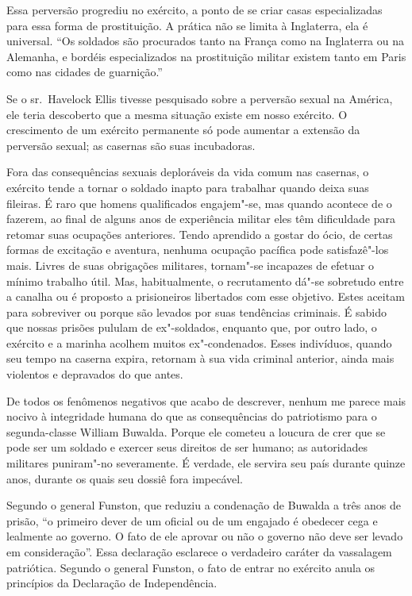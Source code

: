 Essa perversão progrediu no exército, a ponto de se criar casas
especializadas para essa forma de prostituição. A prática não se limita
à Inglaterra, ela é universal. “Os soldados são procurados tanto na
França como na Inglaterra ou na Alemanha, e bordéis especializados na
prostituição militar existem tanto em Paris como nas cidades de
guarnição.”

Se o sr.~Havelock Ellis tivesse pesquisado sobre a perversão sexual na
América, ele teria descoberto que a mesma situação existe em nosso
exército. O crescimento de um exército permanente só pode aumentar a
extensão da perversão sexual; as casernas são suas incubadoras.

Fora das consequências sexuais deploráveis da vida comum nas casernas, o
exército tende a tornar o soldado inapto para trabalhar quando
deixa suas fileiras. É raro que homens qualificados engajem"-se, mas
quando acontece de o fazerem, ao final de alguns anos de experiência
militar eles têm dificuldade para retomar suas ocupações anteriores.
Tendo aprendido a gostar do ócio, de certas formas de excitação e
aventura, nenhuma ocupação pacífica pode satisfazê"-los mais. Livres
de suas obrigações militares, tornam"-se incapazes de efetuar o mínimo
trabalho útil. Mas, habitualmente, o recrutamento dá"-se sobretudo
entre a canalha ou é proposto a prisioneiros libertados com esse
objetivo. Estes aceitam para sobreviver ou porque são levados por suas
tendências criminais. É sabido que nossas prisões pululam de
ex"-soldados, enquanto que, por outro lado, o exército e a marinha
acolhem muitos ex"-condenados. Esses indivíduos, quando seu tempo na
caserna expira, retornam à sua vida criminal anterior, ainda mais
violentos e depravados do que antes.

De todos os fenômenos negativos que acabo de descrever, nenhum me parece
mais nocivo à integridade humana do que as consequências do patriotismo
para o segunda-classe William Buwalda. Porque ele cometeu a loucura de
crer que se pode ser um soldado e exercer seus direitos de ser humano;
as autoridades militares puniram"-no severamente. É verdade, ele
servira seu país durante quinze anos, durante os quais seu dossiê fora
impecável.

Segundo o general Funston, que reduziu a condenação de Buwalda a três
anos de prisão, “o primeiro dever de um oficial ou de um engajado é
obedecer cega e lealmente ao governo. O fato de ele aprovar ou não o
governo não deve ser levado em consideração”. Essa declaração esclarece
o verdadeiro caráter da vassalagem patriótica. Segundo o general
Funston, o fato de entrar no exército anula os princípios da Declaração
de Independência.

